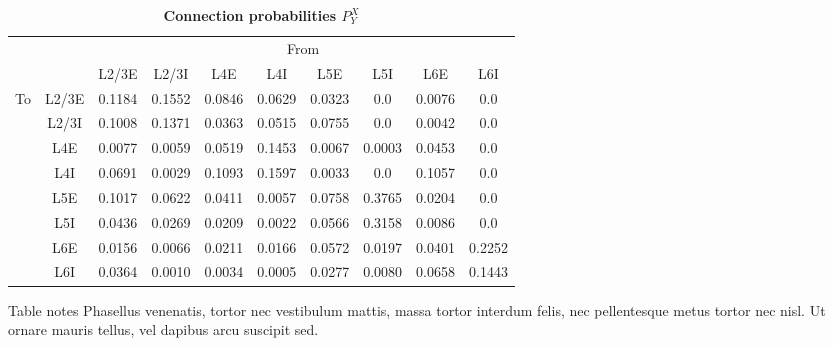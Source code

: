 \documentclass[10pt,letterpaper]{article}
\begin{document}
\begin{table}[!ht]
\centering
\caption{
{\bf Connection probabilities $P_{Y}^{X}$}}
\begin{tabular}[t]{cccccccccc}
\toprule
&&\multicolumn{8}{c}{From} \\
&& L2/3E & L2/3I & L4E & L4I & L5E & L5I & L6E & L6I \\
\midrule
\multirow{8}{*}{To} & \multicolumn{1}{c|}{L2/3E} & 0.1184 & 0.1552 & 0.0846 & 0.0629 & 0.0323 & 0.0 & 0.0076 & 0.0 \\ %

&\multicolumn{1}{c|}{L2/3I} & 0.1008 & 0.1371 & 0.0363 & 0.0515 & 0.0755 & 0.0 & 0.0042 & 0.0 \\ %
&\multicolumn{1}{c|}{L4E} & 0.0077 & 0.0059 & 0.0519 & 0.1453 & 0.0067 & 0.0003 & 0.0453 & 0.0 \\ %
&\multicolumn{1}{c|}{L4I} & 0.0691 & 0.0029 & 0.1093 & 0.1597 & 0.0033 & 0.0 & 0.1057 & 0.0 \\ %
&\multicolumn{1}{c|}{L5E} & 0.1017 & 0.0622 & 0.0411 & 0.0057 & 0.0758 & 0.3765 & 0.0204 & 0.0 \\ %
&\multicolumn{1}{c|}{L5I} & 0.0436 & 0.0269 & 0.0209 & 0.0022 & 0.0566 & 0.3158 & 0.0086 & 0.0 \\ %
&\multicolumn{1}{c|}{L6E} & 0.0156 & 0.0066 & 0.0211 & 0.0166 & 0.0572 & 0.0197 & 0.0401 & 0.2252 \\ %
&\multicolumn{1}{c|}{L6I} & 0.0364 & 0.0010 & 0.0034 & 0.0005 & 0.0277 & 0.0080 & 0.0658 & 0.1443 \\ %
\bottomrule
\end{tabular}
\begin{flushleft} Table notes Phasellus venenatis, tortor nec vestibulum mattis, massa tortor interdum felis, nec pellentesque metus tortor nec nisl. Ut ornare mauris tellus, vel dapibus arcu suscipit sed.
\end{flushleft}
\label{table2}
\end{table}
\end{document}
